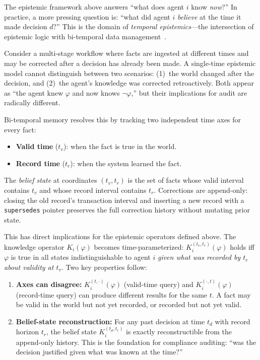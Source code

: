 The epistemic framework above answers ``what does agent $i$ know \emph{now}?'' In practice, a more pressing question is: ``what did agent $i$ \emph{believe} at the time it made decision $d$?'' This is the domain of \emph{temporal epistemics}---the intersection of epistemic logic with bi-temporal data management~\cite{snodgrass2000temporal}.

Consider a multi-stage workflow where facts are ingested at different times and may be corrected after a decision has already been made. A single-time epistemic model cannot distinguish between two scenarios: (1)~the world changed after the decision, and (2)~the agent's knowledge was corrected retroactively. Both appear as ``the agent knew $\varphi$ and now knows $\neg\varphi$,'' but their implications for audit are radically different.

Bi-temporal memory resolves this by tracking two independent time axes for every fact:
\begin{itemize}[leftmargin=*]
\item \textbf{Valid time} ($t_v$): when the fact is true in the world.
\item \textbf{Record time} ($t_r$): when the system learned the fact.
\end{itemize}
The \emph{belief state} at coordinates $(t_v, t_r)$ is the set of facts whose valid interval contains $t_v$ and whose record interval contains $t_r$. Corrections are append-only: closing the old record's transaction interval and inserting a new record with a \texttt{supersedes} pointer preserves the full correction history without mutating prior state.

This has direct implications for the epistemic operators defined above. The knowledge operator $K_i(\varphi)$ becomes time-parameterized: $K_i^{(t_v, t_r)}(\varphi)$ holds iff $\varphi$ is true in all states indistinguishable to agent $i$ \emph{given what was recorded by $t_r$ about validity at $t_v$}. Two key properties follow:

\begin{enumerate}[leftmargin=*]
\item \textbf{Axes can disagree:} $K_i^{(t, \cdot)}(\varphi)$ (valid-time query) and $K_i^{(\cdot, t)}(\varphi)$ (record-time query) can produce different results for the same $t$. A fact may be valid in the world but not yet recorded, or recorded but not yet valid.
\item \textbf{Belief-state reconstruction:} For any past decision at time $t_d$ with record horizon $t_r$, the belief state $K_i^{(t_d, t_r)}$ is exactly reconstructible from the append-only history. This is the foundation for compliance auditing: ``was the decision justified given what was known at the time?''
\end{enumerate}

